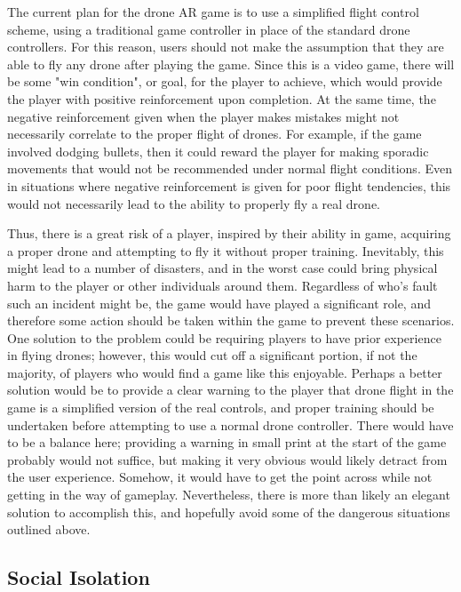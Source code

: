 \documentclass[10pt,twocolumn]{article}
\begin{document}
The current plan for the drone AR game is to use a simplified flight control scheme, using a traditional game controller in place of the standard drone controllers. For this reason, users should not make the assumption that they are able to fly any drone after playing the game. Since this is a video game, there will be some "win condition", or goal, for the player to achieve, which would provide the player with positive reinforcement upon completion. At the same time, the negative reinforcement given when the player makes mistakes might not necessarily correlate to the proper flight of drones. For example, if the game involved dodging bullets, then it could reward the player for making sporadic movements that would not be recommended under normal flight conditions. Even in situations where negative reinforcement is given for poor flight tendencies, this would not necessarily lead to the ability to properly fly a real drone.  

Thus, there is a great risk of a player, inspired by their ability in game, acquiring a proper drone and attempting to fly it without proper training. Inevitably, this might lead to a number of disasters, and in the worst case could bring physical harm to the player or other individuals around them. Regardless of who's fault such an incident might be, the game would have played a significant role, and therefore some action should be taken within the game to prevent these scenarios. One solution to the problem could be requiring players to have prior experience in flying drones; however, this would cut off a significant portion, if not the majority, of players who would find a game like this enjoyable. Perhaps a better solution would be to provide a clear warning to the player that drone flight in the game is a simplified version of the real controls, and proper training should be undertaken before attempting to use a normal drone controller. There would have to be a balance here; providing a warning in small print at the start of the game probably would not suffice, but making it very obvious would likely detract from the user experience. Somehow, it would have to get the point across while not getting in the way of gameplay. Nevertheless, there is more than likely an elegant solution to accomplish this, and hopefully avoid some of the dangerous situations outlined above.

\subsection{Social Isolation}
\end{document}
